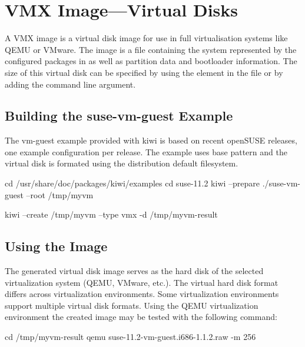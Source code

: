 \chapter{VMX Image---Virtual Disks}
\label{chapter:vmx}
\minitoc

A VMX image is a virtual disk image for use in full virtualisation
systems like QEMU or VMware. The image is a file containing the
system represented by the configured packages in  as well
as partition data and bootloader information. The size of
this virtual disk can be specified by using the  element
in the  file or by adding the  command
line argument.

\section{Building the suse-vm-guest Example}

The vm-guest example provided with kiwi is based on recent openSUSE releases,
one example configuration per release. The example uses base pattern and the
virtual disk is formated using the distribution default filesystem.

\begin{Command}{12cm}
cd /usr/share/doc/packages/kiwi/examples
cd suse-11.2
kiwi --prepare ./suse-vm-guest --root /tmp/myvm
\end{Command}

\begin{Command}{12cm}
kiwi --create /tmp/myvm --type vmx -d /tmp/myvm-result
\end{Command}

\section{Using the Image}

The generated virtual disk image serves as the hard disk of the selected
virtualization system (QEMU, VMware, etc.). The virtual hard disk format 
differs across virtualization environments. Some virtualization environments
support multiple virtual disk formats. Using the QEMU virtualization 
environment the created image may be tested with the following command:

\begin{Command}{12cm}
cd /tmp/myvm-result
qemu suse-11.2-vm-guest.i686-1.1.2.raw -m 256
\end{Command}


